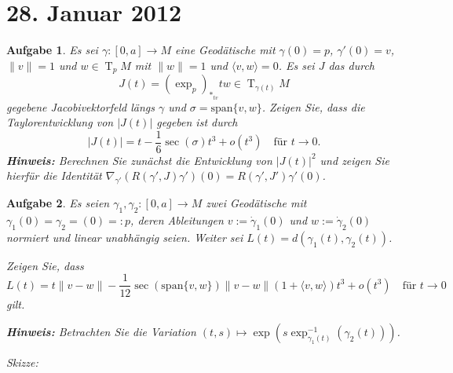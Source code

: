 \documentclass[paper=A4, twoside, chapterprefix=true, bibliography=totoc, headsepline]{scrbook}
\newcommand{\tikzgitter}[3][0.25]{ %
	\draw[step=#1,gray!15] #2 grid #3;
	\draw[step=2*#1,gray!30] #2 grid #3;
	\fill (0,0) circle(0.1); 
}
\DeclareMathOperator{\T}{T} %
\theoremstyle{plain}
\theoremstyle{nonumberplain}
\theoremstyle{empty}
\theoremstyle{break}
\newtheorem{Aufg}{Aufgabe}
\begin{document}

\section{28. Januar 2012}
\setcounter{Aufg}{0} %
\setcounter{Loes}{0}

\begin{Aufg}
Es sei $\gamma:[0,a]\to M$ eine Geodätische mit $\gamma(0)=p$, $\gamma'(0)=v$, $\|v\|=1$ und $w\in \T_pM$ mit $\|w\|=1$ und $\langle v,w\rangle=0$.  Es sei $J$ das durch 
	\[J(t)=(\exp_p)_{*_{tv}}tw \in \T_{\gamma(t)}M\]
gegebene Jacobivektorfeld längs $\gamma$ und $\sigma=\mathrm{span}\{v,w\}$. Zeigen Sie, dass die Taylorentwicklung von $|J(t)|$ gegeben ist durch
	\[|J(t)|=t-\frac{1}{6}\sec(\sigma)t^3+o(t^3) \quad \text{für }t\to0.\]
{\footnotesize \textbf{Hinweis:} Berechnen Sie zunächst die Entwicklung von $|J(t)|^2$ und zeigen Sie hierfür die Identität $\nabla_{\gamma'}(R(\gamma',J)\gamma')(0)=R(\gamma',J')\gamma'(0)$.}
\end{Aufg}

\begin{Aufg}
Es seien $\gamma_1, \gamma_2:[0,a] \to M$ zwei Geodätische mit $\gamma_1(0)=\gamma_2=(0)=:p$, deren Ableitungen $v:=\dot{\gamma}_1(0)$ und $w:=\dot{\gamma}_2(0)$ normiert und linear unabhängig seien. Weiter sei $L(t)=d(\gamma_1(t), \gamma_2(t))$.

Zeigen Sie, dass
	\[L(t)=t\|v-w\|-\frac{1}{12}\sec(\mathrm{span}\{v,w\})\|v-w\|(1+\langle v,w\rangle)t^3 + o(t^3)\quad \text{für }t\to 0\]gilt.

{\footnotesize \textbf{Hinweis:} Betrachten Sie die Variation $(t,s)\mapsto\exp(s\exp^{-1}_{\gamma_1(t)}(\gamma_2(t)))$.}

Skizze:
\begin{center}\end{center}
\end{Aufg}
\end{document}
